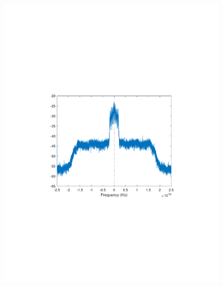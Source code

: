 \begin{refsection}
\begin{figure}[H]
	\centering
	\begin{minipage}{0.30\textwidth}
		\centering
		\includegraphics[clip, trim=4cm 8cm 4cm 8cm, width=1\textwidth]{./sdf/m_qam_system/figures/expResults/homodyne/1_4GBdInSig13dBc_AfFec.pdf}
		\label{fig:4GBdEyeAftFec}
	\end{minipage}
	\begin{minipage}{0.30\textwidth}
		\centering

\end{minipage}
\end{figure}
\end{refsection}
